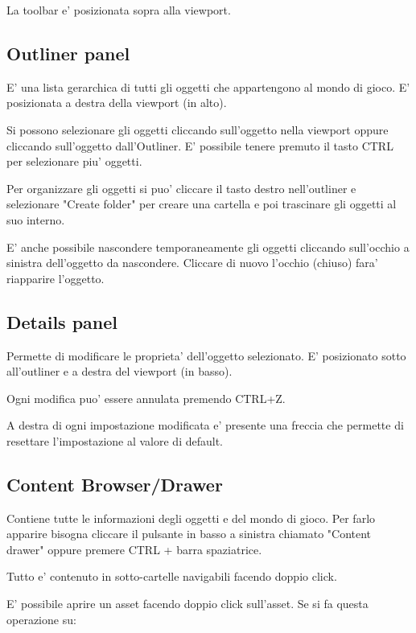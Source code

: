             La toolbar e' posizionata sopra alla viewport.

        \subsection{Outliner panel}
            E' una lista gerarchica di tutti gli oggetti che appartengono al mondo di gioco. E' posizionata a destra della viewport (in alto).

            Si possono selezionare gli oggetti cliccando sull'oggetto nella viewport oppure cliccando sull'oggetto dall'Outliner. E' possibile tenere premuto il tasto CTRL per selezionare piu' oggetti.

            Per organizzare gli oggetti si puo' cliccare il tasto destro nell'outliner e selezionare "Create folder" per creare una cartella e poi trascinare gli oggetti al suo interno.

            E' anche possibile nascondere temporaneamente gli oggetti cliccando sull'occhio a sinistra dell'oggetto da nascondere. Cliccare di nuovo l'occhio (chiuso) fara' riapparire l'oggetto.

        \subsection{Details panel}
            Permette di modificare le proprieta' dell'oggetto selezionato. E' posizionato sotto all'outliner e a destra del viewport (in basso).

            Ogni modifica puo' essere annulata premendo CTRL+Z.

            \begin{notebox}
                A destra di ogni impostazione modificata e' presente una freccia che permette di resettare l'impostazione al valore di default.
            \end{notebox}

        \subsection{Content Browser/Drawer}
            Contiene tutte le informazioni degli oggetti e del mondo di gioco. Per farlo apparire bisogna cliccare il pulsante in basso a sinistra \UEContentBrowserIcon chiamato "Content drawer" oppure premere CTRL + barra spaziatrice.

            Tutto e' contenuto in sotto-cartelle navigabili facendo doppio click.

            E' possibile aprire un asset facendo doppio click sull'asset. Se si fa questa operazione su:

